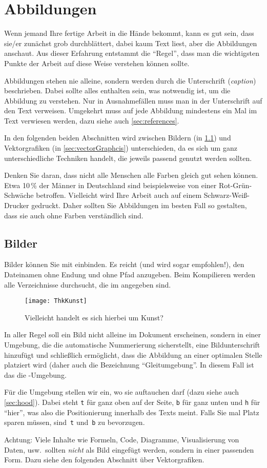 \section{Abbildungen}
\label{sec:figures}
%
Wenn jemand Ihre fertige Arbeit in die Hände bekommt, kann es gut sein, dass sie/er zunächst grob durchblättert, dabei kaum Text liest, aber die Abbildungen anschaut. Aus dieser Erfahrung entstammt die \enquote{Regel}, dass man die wichtigsten Punkte der Arbeit auf diese Weise verstehen können sollte.
\par
Abbildungen stehen nie alleine, sondern werden durch die Unterschrift (\emph{caption}) beschrieben. Dabei sollte alles enthalten sein, was notwendig ist, um die Abbildung zu verstehen. Nur in Ausnahmefällen muss man in der Unterschrift auf den Text verweisen. Umgekehrt muss auf jede Abbildung mindestens ein Mal im Text verwiesen werden, dazu siehe auch \cref{sec:references}.
\par
In den folgenden beiden Abschnitten wird zwischen Bildern (in \cref{sec:images}) und Vektorgrafiken (in \cref{sec:vectorGraphcis}) unterschieden, da es sich um ganz unterschiedliche Techniken handelt, die jeweils passend genutzt werden sollten.
\par
Denken Sie daran, dass nicht alle Menschen alle Farben gleich gut sehen können. Etwa 10\,\% der Männer in Deutschland sind beispielsweise von einer Rot-Grün-Schwäche betroffen. Vielleicht wird Ihre Arbeit auch auf einem Schwarz-Weiß-Drucker gedruckt. Daher sollten Sie Abbildungen im besten Fall so gestalten, dass sie auch ohne Farben verständlich sind.
%
%
\subsection{Bilder}
\label{sec:images}
%
Bilder können Sie mit  einbinden. Es reicht (und wird sogar empfohlen!), den Dateinamen ohne Endung und ohne Pfad anzugeben. Beim Kompilieren werden alle Verzeichnisse durchsucht, die im  angegeben sind.
%
\begin{figure}[tbh]
 \centering
 \texttt{[image: ThkKunst]}
 \caption{Vielleicht handelt es sich hierbei um Kunst?}
 \label{fig:kunst}
\end{figure}
%
In aller Regel soll ein Bild nicht alleine im Dokument erscheinen, sondern in einer Umgebung, die die automatische Nummerierung sicherstellt, eine Bildunterschrift hinzufügt und schließlich ermöglicht, dass die Abbildung an einer optimalen Stelle platziert wird (daher auch die Bezeichnung \enquote{Gleitumgebung}. In diesem Fall ist das die -Umgebung.
\par
Für die Umgebung stellen wir ein, wo sie auftauchen darf (dazu siehe auch \cref{sec:hood}). Dabei steht \texttt{t} für ganz oben auf der Seite, \texttt{b} für ganz unten und \texttt{h} für \enquote{hier}, was also die Positionierung innerhalb des Texts meint. Falls Sie mal Platz sparen müssen, sind~\texttt{t} und~\texttt{b} zu bevorzugen.
\par
Achtung: Viele Inhalte wie Formeln, Code, Diagramme, Visualisierung von Daten, usw.\ sollten \emph{nicht} als Bild eingefügt werden, sondern in einer passenden Form. Dazu siehe den folgenden Abschnitt über Vektorgrafiken.
%
%
